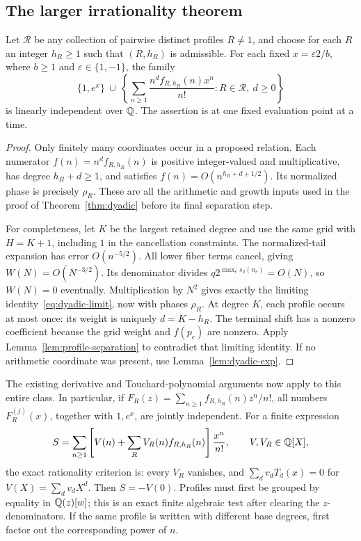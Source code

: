\subsection{The larger irrationality theorem}

\begin{theorem}
\label{thm:profile-transfer}
Let $\mathcal R$ be any collection of pairwise distinct profiles
$R\ne1$, and choose for each $R$ an integer $h_R\geq1$ such that
$(R,h_R)$ is admissible.  For each fixed
$x=\varepsilon2/b$, where $b\geq1$ and $\varepsilon\in\{1,-1\}$,
the family
\begin{equation}\label{eq:profile-independent}
 \{1,e^x\}\ \cup\
 \left\{\sum_{n\geq1}\frac{n^d f_{R,h_R}(n)x^n}{n!}:
                    R\in\mathcal R,\ d\geq0\right\}
\end{equation}
is linearly independent over $\mathbb Q$.  The assertion is at one fixed
evaluation point at a time.
\end{theorem}
\begin{proof}
Only finitely many coordinates occur in a proposed relation.
Each numerator $f(n)=n^df_{R,h_R}(n)$ is positive integer-valued and
multiplicative, has degree $h_R+d\geq1$, and satisfies
$f(n)=O(n^{h_R+d+1/2})$.  Its normalized phase is precisely $\rho_R$.
These are all the arithmetic and growth inputs used in the proof
of Theorem~\ref{thm:dyadic} before its final separation step.

For completeness, let $K$ be the largest retained degree and use
the same grid with $H=K+1$, including $1$ in the cancellation
constraints.  The normalized-tail expansion has error $O(n^{-5/2})$.
All lower fiber terms cancel, giving $W(N)=O(N^{-3/2})$.  Its
denominator divides $q2^{\max_e s_2(n_e)}=O(N)$, so $W(N)=0$
eventually.  Multiplication by $N^2$ gives exactly the limiting
identity~\eqref{eq:dyadic-limit}, now with phases $\rho_R$.
At degree $K$, each profile occurs at most once: its weight is
uniquely $d=K-h_R$.  The terminal shift has a nonzero coefficient
because the grid weight and $f(p_e)$ are nonzero.  Apply
Lemma~\ref{lem:profile-separation} to contradict that limiting
identity.  If no arithmetic coordinate was present, use
Lemma~\ref{lem:dyadic-exp}.
\end{proof}

The existing derivative and Touchard-polynomial arguments now apply
to this entire class.  In particular, if
$F_R(z)=\sum_{n\geq1}f_{R,h_R}(n)z^n/n!$, all numbers
$F_R^{(j)}(x)$, together with $1,e^x$, are jointly independent.
For a finite expression
\[
 S=\sum_{n\geq1}\left[V(n)+\sum_R V_R(n)f_{R,h_R}(n)\right]
                      \frac{x^n}{n!},\qquad V,V_R\in\mathbb Q[X],
\]
the exact rationality criterion is: every $V_R$ vanishes, and
$\sum_d v_dT_d(x)=0$ for $V(X)=\sum_dv_dX^d$.  Then $S=-V(0)$.
Profiles must first be grouped by equality in $\mathbb Q(z)[w]$; this is
an exact finite algebraic test after clearing the $z$-denominators.
If the same profile is written with different base degrees, first
factor out the corresponding power of $n$.

